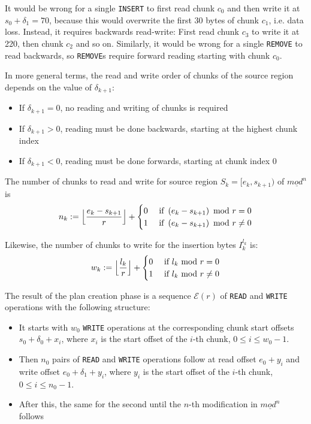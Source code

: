 \documentclass[english, 10pt, openright, twocolumn, landscape, twoside, notitlepage, a4paper, pdftex]		
{article}
\begin{document}
It would be wrong for a single \texttt{INSERT} to first read chunk $c_{0}$ and then write it at $s_{0}+\delta_{1}=70$, because this would overwrite the first 30 bytes of chunk $c_{1}$, i.e. data loss. Instead, it requires backwards read-write: First read chunk $c_{3}$ to write it at 220, then chunk $c_{2}$ and so on. Similarly, it would be wrong for a single \texttt{REMOVE} to read backwards, so \texttt{REMOVE}s require forward reading starting with chunk $c_{0}$.

In more general terms, the read and write order of chunks of the source region depends on the value of $\delta_{k+1}$:
\begin{itemize}
\item If $\delta_{k+1}=0$, no reading and writing of chunks is required
\item If $\delta_{k+1}>0$, reading must be done backwards, starting at the highest chunk index
\item If $\delta_{k+1}<0$, reading must be done forwards, starting at chunk index 0
\end{itemize}

The number of chunks to read and write for source region $S_{k}=[e_{k},s_{k+1})$ of $\underline{mod^{n}}$ is 
\[n_{k}:=\Bigl\lfloor\frac{e_{k}-s_{k+1}}{r}\Bigr\rfloor+
\begin{cases}
0 & \text{ if }\left(e_{k}-s_{k+1}\right)\text{ mod } r = 0\\
1 & \text{ if }\left(e_{k}-s_{k+1}\right)\text{ mod } r \neq 0\\
\end{cases}
\]

Likewise, the number of chunks to write for the insertion bytes $I_{k}^{l_{k}}$ is:
\[w_{k}:=\Bigl\lfloor\frac{l_{k}}{r}\Bigr\rfloor+
\begin{cases}
0 & \text{ if }l_{k}\text{ mod } r = 0\\
1 & \text{ if }l_{k}\text{ mod } r \neq 0\\
\end{cases}
\]

The result of the plan creation phase is a sequence $\mathcal{E}(r)$ of \texttt{READ} and \texttt{WRITE} operations with the following structure:
\begin{itemize}
\item It starts with $w_{0}$ \texttt{WRITE} operations at the corresponding chunk start offsets $s_{0}+\delta_{0}+x_{i}$, where $x_{i}$ is the start offset of the $i$-th chunk, $0\leq i\leq w_{0}-1$.
\item Then $n_{0}$ pairs of \texttt{READ} and \texttt{WRITE} operations follow at read offset $e_{0}+y_{i}$ and write offset $e_{0}+\delta_{1}+y_{i}$, where $y_{i}$ is the start offset of the $i$-th chunk, $0\leq i\leq n_{0}-1$.
\item After this, the same for the second until the $n$-th modification in $\underline{mod^{n}}$ follows
\end{itemize}
\end{document}
